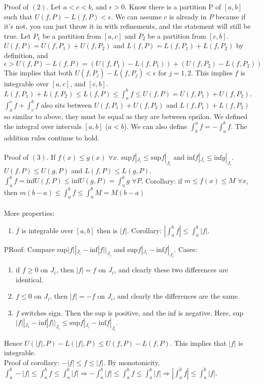 \documentclass[10pt,letter]{article}
\begin{document}
Proof of $(2)$. Let $a<c<b$, and $\epsilon>0$. Know there is a partition P of $[a,b]$ such that $U(f,P)-L(f,P)<\epsilon$. We can assume $c$ is already in $P$ because if it's not, you can just throw it in with refinements, and the statement will still be true. Let $P_1$ be a partition from $[a,c]$ and $P_2$ be a partition from $[c,b]$. $U(f,P)=U(f,P_1)+U(f,P_2)$ and $L(f,P)=L(f,P_1)+L(f,P_2)$ by definition, and $\epsilon>U(f,P)-L(f,P)=(U(f,P_1)-L(f,P_1))+(U(f,P_2)-L(f,P_2))$ This implies that both $U(f,P_j)-L(f,P_j)<\epsilon$ for $j=1,2$. This implies $f$ is integrable over $[a,c]$, and $[c,b]$. $L(f,P_1)+L(f,P_2)\leq L(f,P)\leq\int_a^bf\leq U(f,P)=U(f,P_1)+U(f,P_2)$. $\int_a^cf+\int_c^bf$ also sits between $U(f,P_1)+U(f,P_2)$ and $L(f,P_1)+L(f,P_2)$ so similar to above, they must be equal as they are between epsilon. We defined the integral over intervals $[a,b]$ ($a<b$). We can also define $\int_b^af=-\int_a^bf$. The addition rules continue to hold. \\ \\ 

Proof of $(3)$. If $f(x)\leq g(x)$ $\forall x$. sup$f|_{J_i}\leq \text{sup}f|_{J_i}$ and inf$f|_{J_i}\leq \text{inf}g|_{J_i}$. $U(f,P)\leq U(g,P)$ and $L(f,P)\leq L(g,P)$. $\int_a^bf=\text{inf}U(f,P)\leq\text{inf}U(g,P)=\int_a^bg$ $\forall P$. Corollary: if $m\leq f(x)\leq M$ $\forall x$, then $m(b-a)\leq\int_a^bf\leq \int_a^bM=M(b-a)$\\ \\ 

More properties: \begin{enumerate}
    \item $f$ is integrable over $[a,b]$ then is $|f|$. Corollary: $|\int_a^bf|\leq \int_a^b|f|$. 
\end{enumerate}
PRoof: Compare sup$|f||_{J_i}-\text{inf}|f||_{J_i}$ and sup$f|_{J_i}-\text{inf}f|_{J_i}$. Cases: \begin{enumerate}
    \item if $f\geq0$ on $J_i$, then $|f|=f$ on $J_i$, and clearly these two differences are identical.   
    \item $f\leq0$ on $J_i$, then $|f|=-f$ on $J_i$, and clearly the differences are the same.
    \item $f$ switches sign. Then the sup is positive, and the inf is negative. Here, sup$|f||_{J_1}-\text{inf}|f||_{J_i}\leq \text{sup}f|_{J_i}-\text{inf}f|_{J_i}$.
\end{enumerate}
Hence $U(|f|,P)-L(|f|,P)\leq U(f,P)-L(f,P)$. This implies that $|f|$ is integrable.\\ 
Proof of corollary: $-|f|\leq f\leq |f|$. By monotonicity, $\int_a^b-|f|\leq \int_a^bf\leq \int_a^b|f|\Rightarrow-\int_a^b|f|\leq \int_a^bf\leq \int_a^b|f|\Rightarrow |\int_a^bf|\leq\int_a^b|f|$. 
\end{document}
